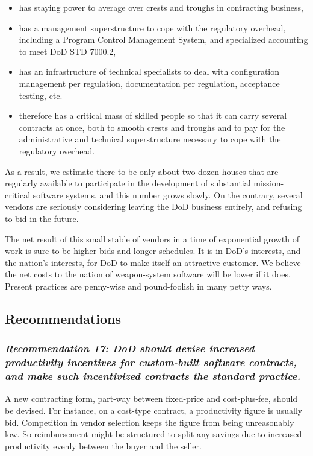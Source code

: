 \documentclass[12pt,final]{article}
\begin{document}
\begin{itemize}
    \item has staying power to average over crests and troughs in contracting
        business,
    \item has a management superstructure to cope with the regulatory overhead,
        including a Program Control Management System, and specialized
        accounting to meet DoD STD 7000.2,
    \item has an infrastructure of technical specialists to deal with
        configuration management per regulation, documentation per regulation,
        acceptance testing, etc.
    \item therefore has a critical mass of skilled people so that it can carry
        several contracts at once, both to smooth crests and troughs and to pay
        for the administrative and technical superstructure necessary to cope
        with the regulatory overhead.
\end{itemize}

As a result, we estimate there to be only about two dozen houses that are
regularly available to participate in the development of substantial
mission-critical software systems, and this number grows slowly. On the
contrary, several vendors are seriously considering leaving the DoD business
entirely, and refusing to bid in the future.

The net result of this small stable of vendors in a time of exponential growth
of work is sure to be higher bids and longer schedules. It is in DoD’s
interests, and the nation’s interests, for DoD to make itself an attractive
customer. We believe the net costs to the nation of weapon-system software will
be lower if it does. Present practices are penny-wise and pound-foolish in many
petty ways.

\subsection*{Recommendations}

\subsubsection*{\textit{Recommendation 17: DoD should devise increased productivity incentives
for custom-built software contracts, and make such incentivized contracts the
standard practice.}}

A new contracting form, part-way between fixed-price and cost-plus-fee, should
be devised. For instance, on a cost-type contract, a productivity figure is
usually bid.  Competition in vendor selection keeps the figure from being
unreasonably low. So reimbursement might be structured to split any savings due
to increased productivity evenly between the buyer and the seller.
\end{document}
